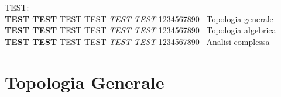 \documentclass[a4paper, twoside]{book}
\begin{document}

\setcounter{page}{1} %



TEST:
\\
\textcolor{TopGener}{\textbf{TEST TEST} TEST TEST \textit{TEST TEST} 1234567890} \ Topologia generale\\
\textcolor{TopAlg}{\textbf{TEST TEST} TEST TEST \textit{TEST TEST} 1234567890} \ Topologia algebrica\\
\textcolor{AnComp}{\textbf{TEST TEST} TEST TEST \textit{TEST TEST} 1234567890} \ Analisi complessa




\frontmatter



\setcounter{page}{1}

\tableofcontents







\mainmatter		%


\part{Topologia Generale}
 
\end{document}
